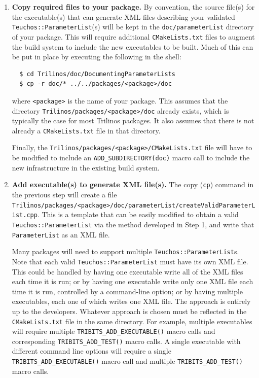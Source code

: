 \documentclass[pdf,ps2pdf,12pt]{smemo}
\begin{document}
\begin{memo}
\begin{enumerate}
\item \textbf{Copy required files to your package.} By convention, the
  source file(s) for the executable(s) that can generate XML files
  describing your validated \texttt{Teuchos::Pa\-ra\-me\-ter\-List}(s)
  will be kept in the \texttt{doc/parameterList} directory of your
  package. This will require additional \texttt{CMakeLists.txt} files
  to augment the build system to include the new executables to be
  built. Much of this can be put in place by executing the following
  in the shell:

 \begin{verbatim}
  $ cd Trilinos/doc/DocumentingParameterLists
  $ cp -r doc/* ../../packages/<package>/doc
 \end{verbatim}

  where \texttt{<package>} is the name of your package. This assumes
  that the directory \texttt{Trilinos/packages/<package>/doc} already
  exists, which is typically the case for most Trilinos packages.  It
  also assumes that there is not already a \texttt{CMakeLists.txt}
  file in that directory.

  Finally, the \texttt{Trilinos/packages/<package>/CMakeLists.txt}
  file will have to be modified to include an
  \texttt{ADD\_SUBDIRECTORY(doc)} macro call to include the new
  infrastructure in the existing build system.

\item \textbf{Add executable(s) to generate XML file(s).} The copy
  (\texttt{cp}) command in the previous step will create a file
  \texttt{Trilinos/packages/<package>/doc/parameter\-List/\-create\-Valid\-Parameter\-List.cpp}.
  This is a template that can be easily modified to obtain a valid
  \texttt{Teuchos::ParameterList} via the method developed in Step 1,
  and write that \texttt{ParameterList} as an XML file.

  Many packages will need to support multiple
  \texttt{Teuchos::ParameterList}s.  Note that each valid
  \texttt{Teuchos::ParameterList} must have its own XML file.  This
  could be handled by having one executable write all of the XML files
  each time it is run; or by having one executable write only one XML
  file each time it is run, controlled by a command-line option; or by
  having multiple executables, each one of which writes one XML
  file. The approach is entirely up to the developers.  Whatever
  approach is chosen must be reflected in the \texttt{CMakeLists.txt}
  file in the same directory. For example, multiple executables will
  require multiple \texttt{TRIBITS\_ADD\_EXECUTABLE()} macro calls and
  corresponding \texttt{TRIBITS\_ADD\_TEST()} macro calls.  A single
  executable with different command line options will require a single
  \texttt{TRIBITS\_ADD\_EXECUTABLE()} macro call and multiple
  \texttt{TRIBITS\_ADD\_TEST()} macro calls.


\end{enumerate}
\end{memo}
\end{document}
